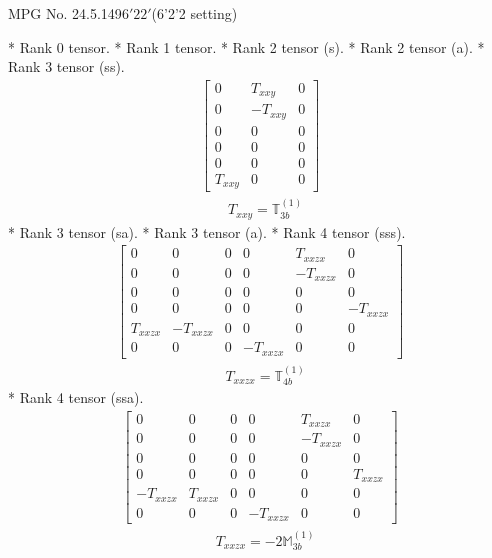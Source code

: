 \documentclass[fleqn,8pt,landscape]{jsarticle}
\begin{document}
\setcounter{MaxMatrixCols}{32}

\renewcommand{\tablename}{Table~}
\renewcommand{\figurename}{Figure~}
\begin{center}
\LARGE
MPG No. 24.5.149\quad$6'22'$\quad(6'2'2 setting)
\end{center}
* Rank 0 tensor.
* Rank 1 tensor.
* Rank 2 tensor (s).
* Rank 2 tensor (a).
* Rank 3 tensor (ss).
\begin{align*}
\begin{bmatrix} 0 & T_{xxy} & 0 \\ 0 & - T_{xxy} & 0 \\ 0 & 0 & 0 \\ 0 & 0 & 0 \\ 0 & 0 & 0 \\ T_{xxy} & 0 & 0 \end{bmatrix}
\end{align*}
\begin{align*}
& T_{xxy} = \mathbb{T}_{3b}^{(1)}
\end{align*}
* Rank 3 tensor (sa).
* Rank 3 tensor (a).
* Rank 4 tensor (sss).
\begin{align*}
\begin{bmatrix} 0 & 0 & 0 & 0 & T_{xxzx} & 0 \\ 0 & 0 & 0 & 0 & - T_{xxzx} & 0 \\ 0 & 0 & 0 & 0 & 0 & 0 \\ 0 & 0 & 0 & 0 & 0 & - T_{xxzx} \\ T_{xxzx} & - T_{xxzx} & 0 & 0 & 0 & 0 \\ 0 & 0 & 0 & - T_{xxzx} & 0 & 0 \end{bmatrix}
\end{align*}
\begin{align*}
& T_{xxzx} = \mathbb{T}_{4b}^{(1)}
\end{align*}
* Rank 4 tensor (ssa).
\begin{align*}
\begin{bmatrix} 0 & 0 & 0 & 0 & T_{xxzx} & 0 \\ 0 & 0 & 0 & 0 & - T_{xxzx} & 0 \\ 0 & 0 & 0 & 0 & 0 & 0 \\ 0 & 0 & 0 & 0 & 0 & T_{xxzx} \\ - T_{xxzx} & T_{xxzx} & 0 & 0 & 0 & 0 \\ 0 & 0 & 0 & - T_{xxzx} & 0 & 0 \end{bmatrix}
\end{align*}
\begin{align*}
& T_{xxzx} = - 2 \mathbb{M}_{3b}^{(1)}
\end{align*}
\end{document}
